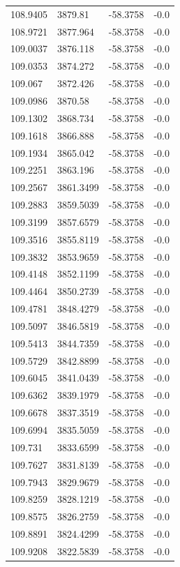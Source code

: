 \begin{table}[H]
\begin{tabular}{llll}
108.9405 & 3879.81 & -58.3758 & -0.0 \\
108.9721 & 3877.964 & -58.3758 & -0.0 \\
109.0037 & 3876.118 & -58.3758 & -0.0 \\
109.0353 & 3874.272 & -58.3758 & -0.0 \\
109.067 & 3872.426 & -58.3758 & -0.0 \\
109.0986 & 3870.58 & -58.3758 & -0.0 \\
109.1302 & 3868.734 & -58.3758 & -0.0 \\
109.1618 & 3866.888 & -58.3758 & -0.0 \\
109.1934 & 3865.042 & -58.3758 & -0.0 \\
109.2251 & 3863.196 & -58.3758 & -0.0 \\
109.2567 & 3861.3499 & -58.3758 & -0.0 \\
109.2883 & 3859.5039 & -58.3758 & -0.0 \\
109.3199 & 3857.6579 & -58.3758 & -0.0 \\
109.3516 & 3855.8119 & -58.3758 & -0.0 \\
109.3832 & 3853.9659 & -58.3758 & -0.0 \\
109.4148 & 3852.1199 & -58.3758 & -0.0 \\
109.4464 & 3850.2739 & -58.3758 & -0.0 \\
109.4781 & 3848.4279 & -58.3758 & -0.0 \\
109.5097 & 3846.5819 & -58.3758 & -0.0 \\
109.5413 & 3844.7359 & -58.3758 & -0.0 \\
109.5729 & 3842.8899 & -58.3758 & -0.0 \\
109.6045 & 3841.0439 & -58.3758 & -0.0 \\
109.6362 & 3839.1979 & -58.3758 & -0.0 \\
109.6678 & 3837.3519 & -58.3758 & -0.0 \\
109.6994 & 3835.5059 & -58.3758 & -0.0 \\
109.731 & 3833.6599 & -58.3758 & -0.0 \\
109.7627 & 3831.8139 & -58.3758 & -0.0 \\
109.7943 & 3829.9679 & -58.3758 & -0.0 \\
109.8259 & 3828.1219 & -58.3758 & -0.0 \\
109.8575 & 3826.2759 & -58.3758 & -0.0 \\
109.8891 & 3824.4299 & -58.3758 & -0.0 \\
109.9208 & 3822.5839 & -58.3758 & -0.0 \\

\end{tabular}
\end{table}
